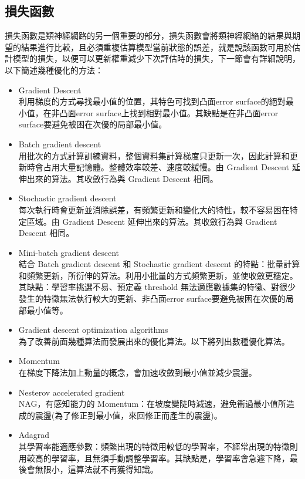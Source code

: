 \subsection{損失函數}
損失函數是類神經網路的另一個重要的部分，損失函數會將類神經網絡的結果與期望的結果進行比較，且必須重複估算模型當前狀態的誤差，就是說該函數可用於估計模型的損失，以便可以更新權重減少下次評估時的損失，下一節會有詳細說明，以下簡述幾種優化的方法：\\
\begin{itemize}
\item Gradient Descent\\
利用梯度的方式尋找最小值的位置，其特色可找到凸面error surface的絕對最小值，在非凸面error surface上找到相對最小值。其缺點是在非凸面error surface要避免被困在次優的局部最小值。
\item Batch gradient descent\\
用批次的方式計算訓練資料，整個資料集計算梯度只更新一次，因此計算和更新時會占用大量記憶體。整體效率較差、速度較緩慢。由 Gradient Descent 延伸出來的算法。其收斂行為與 Gradient Descent 相同。
\item Stochastic gradient descent\\
每次執行時會更新並消除誤差，有頻繁更新和變化大的特性，較不容易困在特定區域。由 Gradient Descent 延伸出來的算法。其收斂行為與 Gradient Descent 相同。
\item Mini-batch gradient descent\\
結合 Batch gradient descent 和 Stochastic gradient descent 的特點：批量計算和頻繁更新，所衍伸的算法。利用小批量的方式頻繁更新，並使收斂更穩定。其缺點：學習率挑選不易、預定義 threshold 無法適應數據集的特徵、對很少發生的特徵無法執行較大的更新、非凸面error surface要避免被困在次優的局部最小值等。
\item Gradient descent optimization algorithms\\
為了改善前面幾種算法而發展出來的優化算法。以下將列出數種優化算法。
\item Momentum\\
在梯度下降法加上動量的概念，會加速收斂到最小值並減少震盪。
\item Nesterov accelerated gradient\\
NAG，有感知能力的 Momentum：在坡度變陡時減速，避免衝過最小值所造成的震盪(為了修正到最小值，來回修正而產生的震盪)。
\item Adagrad\\
其學習率能適應參數：頻繁出現的特徵用較低的學習率，不經常出現的特徵則用較高的學習率，且無須手動調整學習率。其缺點是，學習率會急遽下降，最後會無限小，這算法就不再獲得知識。

\end{itemize}
